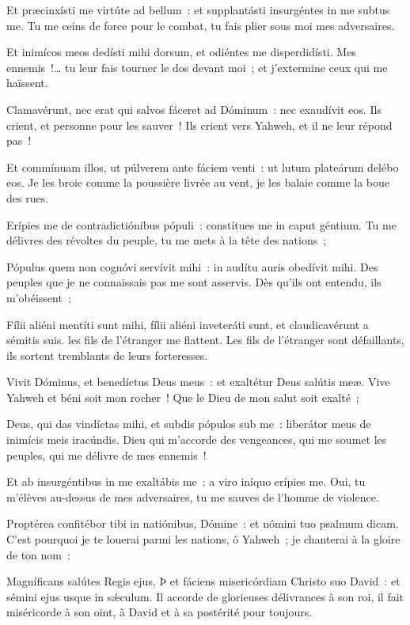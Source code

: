 \begin{paracol}{2}

\LigneParacol{0cm}
{Et præcinxísti me virtúte ad bellum~: \GreStar{} et supplantásti insurgéntes in me subtus me.}
{Tu me ceins de force pour le combat, tu fais plier sous moi mes adversaires. }

\LigneParacol{0.2cm}
{Et inimícos meos dedísti mihi dorsum, \GreStar{} et odiéntes me disperdidísti.}
{Mes ennemis~!… tu leur fais tourner le dos devant moi~; et j'extermine ceux qui me haïssent. }

\LigneParacol{0.2cm}
{Clamavérunt, nec erat qui salvos fáceret ad Dóminum~: \GreStar{} nec exaudívit eos.}
{Ils crient, et personne pour les sauver~! Ils crient vers Yahweh, et il ne leur répond pas~! }

\LigneParacol{0.2cm}
{Et commínuam illos, ut púlverem ante fáciem venti~: \GreStar{} ut lutum plateárum delébo eos.}
{Je les broie comme la poussière livrée au vent, je les balaie comme la boue des rues. }

\LigneParacol{0.2cm}
{Erípies me de contradictiónibus pópuli~: \GreStar{} constítues me in caput géntium.}
{Tu me délivres des révoltes du peuple, tu me mets à la tête des nations~;}

\LigneParacol{0.2cm}
{Pópulus quem non cognóvi servívit mihi~: \GreStar{} in audítu auris obedívit mihi.}
{Des peuples que je ne connaissais pas me sont asservis. Dès qu'ils ont entendu, ils m'obéissent~;}

\LigneParacol{0.2cm}
{Fílii aliéni mentíti sunt mihi, \GreStar{} fílii aliéni inveteráti sunt, et claudicavérunt a sémitis suis.}
{les fils de l'étranger me flattent. Les fils de l'étranger sont défaillants, ils sortent tremblants de leurs forteresses. }

\end{paracol}
\Gloria
\begin{paracol}{2}

\LigneParacol{0cm}
{Vivit Dóminus, et benedíctus Deus meus~: \GreStar{} et exaltétur Deus salútis meæ.}
{Vive Yahweh et béni soit mon rocher~! Que le Dieu de mon salut soit exalté~; }

\LigneParacol{0.2cm}
{Deus, qui das vindíctas mihi, et subdis pópulos sub me~: \GreStar{} liberátor meus de inimícis meis iracúndis.}
{Dieu qui m'accorde des vengeances, qui me soumet les peuples, qui me délivre de mes ennemis~!}

\LigneParacol{0.2cm}
{Et ab insurgéntibus in me exaltábis me~: \GreStar{} a viro iníquo erípies me.}
{Oui, tu m'élèves au-dessus de mes adversaires, tu me sauves de l'homme de violence. }

\LigneParacol{0.2cm}
{Proptérea confitébor tibi in natiónibus, Dómine~: \GreStar{} et nómini tuo psalmum dicam.}
{C'est pourquoi je te louerai parmi les nations, ô Yahweh~; je chanterai à la gloire de ton nom~:}

\LigneParacol{0.2cm}
{Magníficans salútes Regis ejus, Þ et fáciens misericórdiam Christo suo David~: \GreStar{} et sémini ejus usque in sǽculum.}
{Il accorde de glorieuses délivrances à son roi, il fait miséricorde à son oint, à David et à sa postérité pour toujours. }

\end{paracol}
